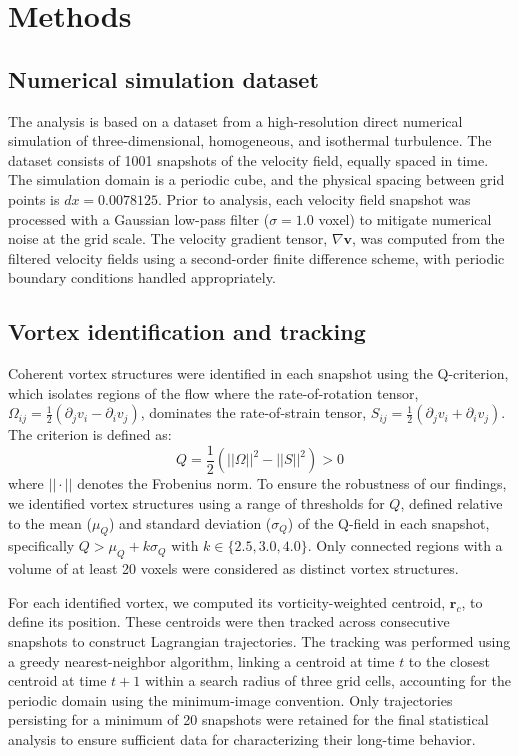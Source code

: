 \documentclass[]{article}
\begin{document}
\section{Methods}
\label{sec:methods}
\subsection{Numerical simulation dataset}
The analysis is based on a dataset from a high-resolution direct numerical simulation of three-dimensional, homogeneous, and isothermal turbulence. The dataset consists of 1001 snapshots of the velocity field, equally spaced in time. The simulation domain is a periodic cube, and the physical spacing between grid points is $dx=0.0078125$. Prior to analysis, each velocity field snapshot was processed with a Gaussian low-pass filter ($\sigma=1.0$ voxel) to mitigate numerical noise at the grid scale. The velocity gradient tensor, $\nabla \mathbf{v}$, was computed from the filtered velocity fields using a second-order finite difference scheme, with periodic boundary conditions handled appropriately.

\subsection{Vortex identification and tracking}
Coherent vortex structures were identified in each snapshot using the Q-criterion, which isolates regions of the flow where the rate-of-rotation tensor, $\Omega_{ij} = \frac{1}{2}(\partial_j v_i - \partial_i v_j)$, dominates the rate-of-strain tensor, $S_{ij} = \frac{1}{2}(\partial_j v_i + \partial_i v_j)$. The criterion is defined as:
\begin{equation}
    Q = \frac{1}{2} \left( ||\Omega||^2 - ||S||^2 \right) > 0
\end{equation}
where $||\cdot||$ denotes the Frobenius norm. To ensure the robustness of our findings, we identified vortex structures using a range of thresholds for $Q$, defined relative to the mean ($\mu_Q$) and standard deviation ($\sigma_Q$) of the Q-field in each snapshot, specifically $Q > \mu_Q + k\sigma_Q$ with $k \in \{2.5, 3.0, 4.0\}$. Only connected regions with a volume of at least 20 voxels were considered as distinct vortex structures.

For each identified vortex, we computed its vorticity-weighted centroid, $\mathbf{r}_c$, to define its position. These centroids were then tracked across consecutive snapshots to construct Lagrangian trajectories. The tracking was performed using a greedy nearest-neighbor algorithm, linking a centroid at time $t$ to the closest centroid at time $t+1$ within a search radius of three grid cells, accounting for the periodic domain using the minimum-image convention. Only trajectories persisting for a minimum of 20 snapshots were retained for the final statistical analysis to ensure sufficient data for characterizing their long-time behavior.
\end{document}
